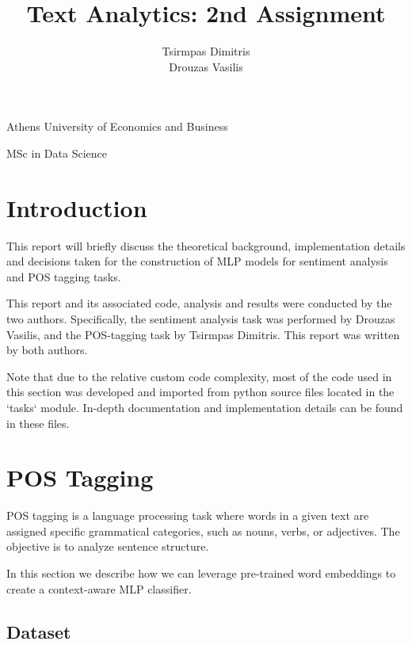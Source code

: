 \documentclass[10pt, a4paper]{article}
\title{\Huge Text Analytics: 2nd Assignment}
\author{\LARGE Tsirmpas Dimitris\\\LARGE Drouzas Vasilis}
\begin{document}
	
	\begin{titlepage}
		\maketitle
		\begin{center}
			
			\large Athens University of Economics and Business
			
			\large MSc in Data Science
			
		\end{center}
		
	\end{titlepage}
	
	\tableofcontents
	\newpage	
	
	\section{Introduction}
	
	This report will briefly discuss the theoretical background, implementation details and decisions taken for the construction of MLP models for sentiment analysis and POS tagging tasks.
	
	This report and its associated code, analysis and results were conducted by the two authors. Specifically, the sentiment analysis task was performed by Drouzas Vasilis, and the POS-tagging task by Tsirmpas Dimitris. This report was written by both authors.
		
	Note that due to the relative custom code complexity, most of the code used in this section was developed and imported from python source files located in the `tasks` module. In-depth documentation and implementation details can be found in these files. 
	
	
	\section{POS Tagging}
	
	POS tagging is a language processing task where words in a given text are assigned specific grammatical categories, such as nouns, verbs, or adjectives. The objective is to analyze sentence structure. 
	
	In this section we describe how we can leverage pre-trained word embeddings to create a context-aware MLP classifier.
	
	
	\subsection{Dataset}
	
\end{document}
